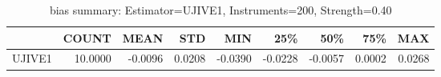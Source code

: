 \begin{table}[ht]
\centering
\caption{bias summary: Estimator=UJIVE1, Instruments=200, Strength=0.40}
\begin{tabular}{lrrrrrrrr}
\toprule
 & COUNT & MEAN & STD & MIN & 25\% & 50\% & 75\% & MAX \\
\midrule
UJIVE1 & 10.0000 & -0.0096 & 0.0208 & -0.0390 & -0.0228 & -0.0057 & 0.0002 & 0.0268 \\
\bottomrule
\end{tabular}
\end{table}
